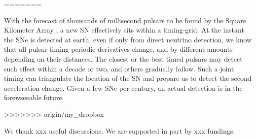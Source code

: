 \documentclass[aps,showpacs,twocolumn,floats,prd,superscriptaddress,nofootinbib]{revtex4-1}
\begin{document}
 
=======

With the forecast of thousands of millisecond pulsars to be found by the Square Kilometer Array \cite{SKA}, a new SN effectively sits within a timing-grid. At the instant the SNe is detected at earth, even if only from direct neutrino detection, we know that all pulsar timing periodic derivatives change, and by different amounts depending on their distances. The closest or the best timed pulsars may detect such effect within a decade or two, and others gradually follow. Such a joint timing can triangulate the location of the SN and prepare us to detect the second acceleration change. Given a few SNe per century\cite{SNrate06}, an actual detection is in the forewseeable future.

>>>>>>> origin/my_dropbox

\acknowledgments

We thank xxx useful discussions. We are supported in part by xxx fundings.

\appendix

%

\end{document}
